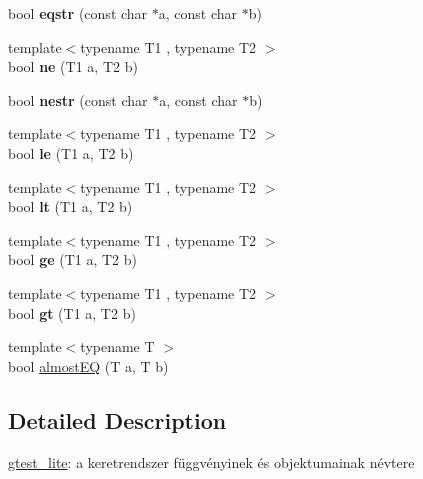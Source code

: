 \begin{DoxyCompactItemize}
\mbox{\label{namespacegtest__lite_a34055f353dabbe4ed9063f1d36af6022}} 
bool {\bfseries eqstr} (const char $\ast$a, const char $\ast$b)
\item 
\mbox{\label{namespacegtest__lite_a2f36af995c570e62f68c148f7393eb54}} 
{\footnotesize template$<$typename T1 , typename T2 $>$ }\\bool {\bfseries ne} (T1 a, T2 b)
\item 
\mbox{\label{namespacegtest__lite_a0a34b1bb0d55bc0c6a3e878ec2bcd49f}} 
bool {\bfseries nestr} (const char $\ast$a, const char $\ast$b)
\item 
\mbox{\label{namespacegtest__lite_a5cd2ce368021471b16b4814b179c9c34}} 
{\footnotesize template$<$typename T1 , typename T2 $>$ }\\bool {\bfseries le} (T1 a, T2 b)
\item 
\mbox{\label{namespacegtest__lite_afb471377c0d2d30aeeaf8912db72f0ff}} 
{\footnotesize template$<$typename T1 , typename T2 $>$ }\\bool {\bfseries lt} (T1 a, T2 b)
\item 
\mbox{\label{namespacegtest__lite_a77c1a7cf1d34c46c1d97ed39b9f06050}} 
{\footnotesize template$<$typename T1 , typename T2 $>$ }\\bool {\bfseries ge} (T1 a, T2 b)
\item 
\mbox{\label{namespacegtest__lite_aa0100ec9e095a9403a7b70ad4a162fdd}} 
{\footnotesize template$<$typename T1 , typename T2 $>$ }\\bool {\bfseries gt} (T1 a, T2 b)
\item 
{\footnotesize template$<$typename T $>$ }\\bool \mbox{\hyperlink{namespacegtest__lite_affbf9748c4e4dec6db137f7c147fee61}{almost\+EQ}} (T a, T b)
\end{DoxyCompactItemize}


\subsection{Detailed Description}
\mbox{\hyperlink{namespacegtest__lite}{gtest\+\_\+lite}}\+: a keretrendszer függvényinek és objektumainak névtere 

